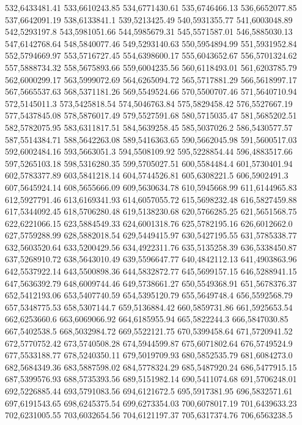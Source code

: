 532,6433481.41
533,6610243.85
534,6771430.61
535,6746466.13
536,6652077.85
537,6642091.19
538,6133841.1
539,5213425.49
540,5931355.77
541,6003048.89
542,5293197.8
543,5981051.66
544,5985679.31
545,5571587.01
546,5885030.13
547,6142768.64
548,5840077.46
549,5293140.63
550,5954894.99
551,5931952.84
552,5794669.97
553,5716727.45
554,6398600.17
555,6043652.67
556,5701324.62
557,5888734.32
558,5675893.66
559,6004235.56
560,6118493.01
561,6203785.79
562,6000299.17
563,5999072.69
564,6265094.72
565,5717881.29
566,5618997.17
567,5665537.63
568,5371181.26
569,5549524.66
570,5500707.46
571,5640710.94
572,5145011.3
573,5425818.54
574,5046763.84
575,5829458.42
576,5527667.19
577,5437845.08
578,5876017.49
579,5527591.68
580,5715035.47
581,5685202.51
582,5782075.95
583,6311817.51
584,5639258.45
585,5037026.2
586,5430577.57
587,5514384.71
588,5642263.08
589,5416363.65
590,5662045.98
591,5600517.03
592,6002484.16
593,5663051.3
594,5508109.92
595,5228854.44
596,4883517.66
597,5265103.18
598,5316280.35
599,5705027.51
600,5584484.4
601,5730401.94
602,5783377.89
603,5841218.14
604,5744526.81
605,6308221.5
606,5902491.3
607,5645924.14
608,5655666.09
609,5630634.78
610,5945668.99
611,6144965.83
612,5927791.46
613,6169341.93
614,6057055.72
615,5698232.48
616,5827459.88
617,5344092.45
618,5706280.48
619,5138230.68
620,5766285.25
621,5651568.75
622,6221066.15
623,5884549.33
624,6001318.76
625,5782195.16
626,6012662.0
627,5759288.99
628,5882018.54
629,5449415.97
630,5427195.55
631,5785338.77
632,5603520.64
633,5200429.56
634,4922311.76
635,5135258.39
636,5338450.87
637,5268910.72
638,5643010.49
639,5596647.77
640,4842112.13
641,4903863.96
642,5537922.14
643,5500898.36
644,5832872.77
645,5699157.15
646,5288941.15
647,5636392.79
648,6009744.46
649,5738661.27
650,5549368.91
651,5678376.37
652,5412193.06
653,5407740.59
654,5395120.79
655,5649748.4
656,5592568.79
657,5348775.53
658,5307144.7
659,5136884.42
660,5859731.86
661,5925653.54
662,6253660.6
663,6069066.92
664,6185955.94
665,5822244.3
666,5847030.85
667,5402538.5
668,5032984.72
669,5522121.75
670,5399458.64
671,5720941.52
672,5770752.42
673,5740508.28
674,5944599.87
675,6071802.64
676,5749524.9
677,5533188.77
678,5240350.11
679,5019709.93
680,5852535.79
681,6084273.0
682,5684349.36
683,5887598.02
684,5778324.29
685,5487920.24
686,5477915.15
687,5399576.93
688,5735393.56
689,5151982.14
690,5411074.68
691,5706248.01
692,5226885.44
693,5791083.56
694,6121672.5
695,5917381.95
696,5832571.61
697,6191543.65
698,6245375.54
699,6273354.03
700,6078017.19
701,6439633.23
702,6231005.55
703,6032654.56
704,6121197.37
705,6317374.76
706,6563238.5
